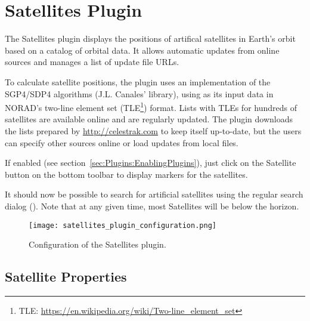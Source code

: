 \newpage
\section{Satellites Plugin}
\label{sec:plugins:Satellites}


\noindent The Satellites plugin displays the positions of artifical satellites in Earth's orbit based on a catalog of orbital data. It allows
automatic updates from online sources and manages a list of update
file URLs.

To calculate satellite positions, the plugin uses an implementation of
the SGP4/SDP4 algorithms (J.L. Canales'  library), using
as its input data in NORAD's two-line element set
(TLE\footnote{TLE: \url{https://en.wikipedia.org/wiki/Two-line_element_set}})
format. Lists with TLEs for hundreds of satellites are available
online and are regularly updated. The plugin downloads the lists
prepared by \url{http://celestrak.com} to keep itself up-to-date, but the users can
specify other sources online or load updates from local files.

If enabled (see
section~\ref{sec:Plugins:EnablingPlugins}), just click on the
Satellite button   on the bottom
toolbar to display markers for the satellites.

It should now be possible to search for artificial satellites using
the regular search dialog (). Note that at any given time, most
Satellites will be below the horizon.

\begin{figure}[htbp]
\centering\texttt{[image: satellites\_plugin\_configuration.png]}
\caption{Configuration of the Satellites plugin.}
\end{figure}


\subsection{Satellite Properties}
\label{sec:plugins:Satellites:properties}

